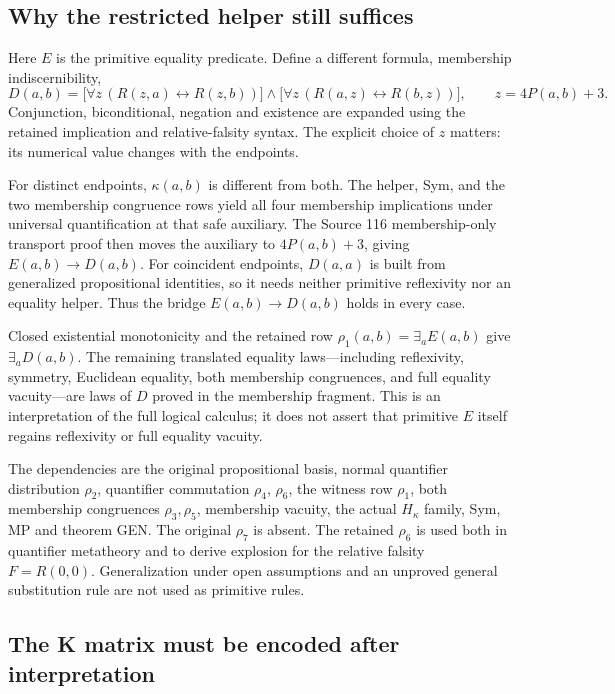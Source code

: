 \subsection{Why the restricted helper still suffices}

Here $E$ is the primitive equality predicate.  Define a different formula,
membership indiscernibility,
\[
 D(a,b)=
 \bigl[\forall z\,(R(z,a)\leftrightarrow R(z,b))\bigr]
 \mathbin{\wedge}
 \bigl[\forall z\,(R(a,z)\leftrightarrow R(b,z))\bigr],
 \qquad z=4P(a,b)+3.
\]
Conjunction, biconditional, negation and existence are expanded using the
retained implication and relative-falsity syntax.  The explicit choice of
$z$ matters: its numerical value changes with the endpoints.

For distinct endpoints, $\kappa(a,b)$ is different from both.  The helper,
Sym, and the two membership congruence rows yield all four membership
implications under universal quantification at that safe auxiliary.
The Source 116 membership-only transport proof then moves the auxiliary
to $4P(a,b)+3$, giving $E(a,b)\to D(a,b)$.  For coincident endpoints,
$D(a,a)$ is built from generalized propositional identities, so it needs
neither primitive reflexivity nor an equality helper.  Thus the bridge
$E(a,b)\to D(a,b)$ holds in every case.

Closed existential monotonicity and the retained row
$\rho_1(a,b)=\exists_a E(a,b)$ give $\exists_a D(a,b)$.  The remaining
translated equality laws---including reflexivity, symmetry, Euclidean
equality, both membership congruences, and full equality vacuity---are
laws of $D$ proved in the membership fragment.  This is an interpretation
of the full logical calculus; it does not assert that primitive $E$
itself regains reflexivity or full equality vacuity.

The dependencies are the original propositional basis, normal quantifier
distribution $\rho_2$, quantifier commutation $\rho_4$, $\rho_6$, the
witness row $\rho_1$, both membership congruences $\rho_3,\rho_5$,
membership vacuity, the actual $H_\kappa$ family, Sym, MP and theorem GEN.
The original $\rho_7$ is absent.  The retained $\rho_6$ is used both in
quantifier metatheory and to derive explosion for the relative falsity
$F=R(0,0)$.  Generalization under open assumptions and an unproved general
substitution rule are not used as primitive rules.

\subsection{The K matrix must be encoded after interpretation}

